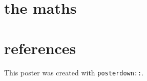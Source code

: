 \documentclass[article,30pt,extrafontsizes]{memoir}
\begin{document}
\begin{adjmulticols*}{3}{0.5in}{0.5in}
{\vfill\null
\columnbreak

\hypertarget{the-maths}{%
\section{the maths}\label{the-maths}}

\hypertarget{references}{%
\section{references}\label{references}}

This poster was created with \texttt{posterdown::}.

\small\printbibliography
}
\end{adjmulticols*}
\end{document}
